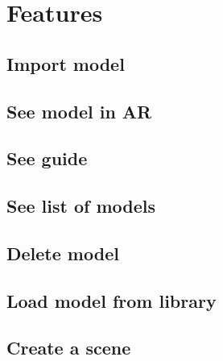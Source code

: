 \section{Features}
\subsection{Import model}
\subsection{See model in AR}
\subsection{See guide}
\subsection{See list of models}
\subsection{Delete model}
\subsection{Load model from library}
\subsection{Create a scene}


